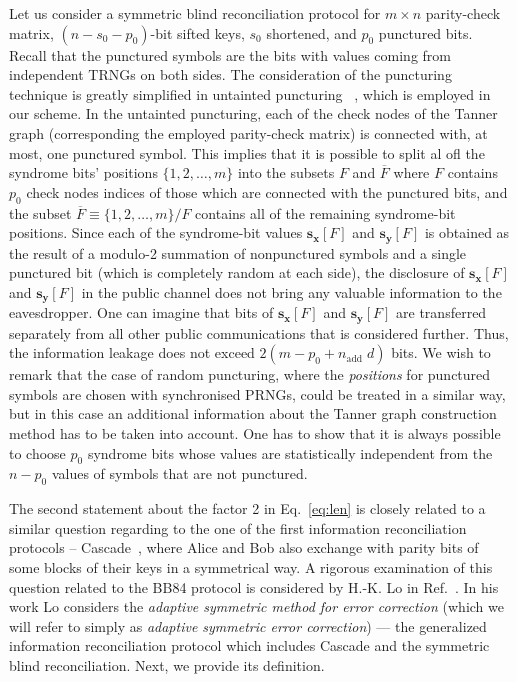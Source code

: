 \documentclass[aps,pra,twocolumn,amsmath,amssymb,nofootinbib,showpacs,superscriptaddress]{revtex4-1}
\renewcommand{\sb}{\mathbf{s}}
\newcommand{\xb}{\mathbf{x}}
\newcommand{\yb}{\mathbf{y}}
\begin{document}
Let us consider a symmetric blind reconciliation protocol for ${m}\times{n}$ parity-check matrix,  $(n-s_0-p_0)$-bit sifted keys, $s_0$ shortened, and $p_0$ punctured bits.
Recall that the punctured symbols are the bits with values coming from independent TRNGs on both sides. 
The consideration of the puncturing technique is greatly simplified in untainted puncturing ~\cite{UntP}, which is employed in our scheme.
In the untainted puncturing, each of the check nodes of the Tanner graph (corresponding the employed parity-check matrix) is connected with, at most, one punctured symbol.
This implies that it is possible to split al ofl the syndrome bits' positions $\{1,2,\ldots,m\}$ into the subsets $F$ and $\overline{F}$ 
where $F$ contains $p_0$ check nodes indices of those which are connected with the punctured bits, and the subset $\overline{F}\equiv \{1,2,\ldots,m\}/F$ contains all of the remaining syndrome-bit positions.
Since each of the syndrome-bit values $\sb_\xb[F]$ and $\sb_\yb[F]$ is obtained as the result of a modulo-2 summation of nonpunctured symbols and a single punctured bit (which is completely random at each side), 
the disclosure of $\sb_\xb[F]$ and $\sb_\yb[F]$ in the public channel does not bring any valuable information to the eavesdropper.
One can imagine that bits of $\sb_\xb[F]$ and $\sb_\yb[F]$ are transferred separately from all other public communications that is considered further. 
Thus, the information leakage does not exceed $2(m-p_0+n_\mathrm{add}\;d)$ bits.
We wish to remark that the case of random puncturing, where the \emph{positions} for punctured symbols are chosen with synchronised PRNGs, 
could be treated in a similar way, but in this case an additional information about the Tanner graph construction method has to be taken into account. 
One has to show that it is always possible to choose $p_0$ syndrome bits whose values are statistically independent from the $n-p_0$ values of symbols that are not punctured.

The second statement about the factor 2 in Eq.~\eqref{eq:len} is closely related to a similar question regarding to the one of the first information reconciliation protocols -- Cascade~\cite{Cascade1_orig}, 
where Alice and Bob also exchange with parity bits of some blocks of their keys in a symmetrical way.
A rigorous examination of this question related to the BB84 protocol is considered by H.-K. Lo in Ref.~\cite{LO_decoupling}.
In his work Lo considers the \emph{adaptive symmetric method for error correction} (which we will refer to simply as \emph{adaptive symmetric error correction}) --- 
the generalized information reconciliation protocol which includes Cascade and the symmetric blind reconciliation.
Next, we provide its definition.
\end{document}
